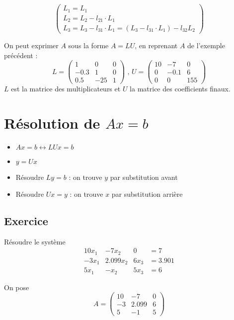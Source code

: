 \documentclass[11pt,a4paper]{report}
\begin{document}
$$
\begin{pmatrix}
L_1  = L_1\\
L_2  = L_2 - l_{21}\cdot L_1\\
L_3 = L_3 - l_{31}\cdot L_1 = (L_3 - l_{31}\cdot L_1) - l_{32}L_2
\end{pmatrix}
$$

On peut exprimer $A$ sous la forme $A=LU$, en reprenant $A$ de l'exemple précédent :
$$
L = 
\begin{pmatrix}
1 & 0 & 0 \\
-0.3 & 1 & 0 \\
0.5 & -25 & 1
\end{pmatrix}
\text{ , }
U = 
\begin{pmatrix}
10 & -7 & 0 \\
0 & -0.1 & 6 \\
0 & 0 & 155
\end{pmatrix}
$$
$L$ est la matrice des multiplicateurs et $U$ la matrice des coefficients finaux.

\section{Résolution de $Ax=b$}

\begin{itemize}
    \item $Ax = b \longleftrightarrow LUx=b$
    \item $y = Ux$
    \item Résoudre $Ly = b$ : on trouve $y$ par substitution avant
    \item Résoudre $Ux = y$ : on trouve $x$ par substitution arrière
\end{itemize}

\subsection{Exercice}
Résoudre le système
$$
\begin{array}{cccc}
10x_1 & -7x_2 & 0 & =7 \\ 
-3x_1 & 2.099x_2 & 6x_3 & =3.901 \\ 
5x_1 & -x_2 & 5x_3 & =6
\end{array} 
$$

On pose
$$
A = 
\begin{pmatrix}
10 & -7 & 0 \\
-3 & 2.099 & 6 \\
5 & -1 & 5
\end{pmatrix}
$$
\end{document}
